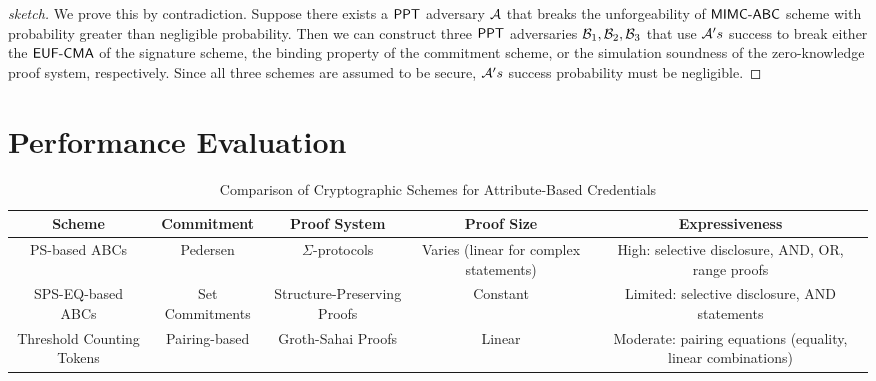 \begin{proof}[sketch]
    We prove this by contradiction. Suppose there exists a $\mathsf{PPT}$ adversary $\mathcal{A}$ that breaks the unforgeability of $\mathsf{MIMC\text{-}ABC}$ scheme with probability greater than negligible probability. Then we can construct three $\mathsf{PPT}$ adversaries $\mathcal{B}_1, \mathcal{B}_2, \mathcal{B}_3$ that use $\mathcal{A}'s$ success to break either the $\mathsf{EUF\text{-}CMA}$ of the signature scheme, the binding property of the commitment scheme, or the simulation soundness of the zero-knowledge proof system, respectively. Since all three schemes are assumed to be secure, $\mathcal{A}'s$ success probability must be negligible.
\end{proof}












\newpage
\section{Performance Evaluation}

\begin{table}[h]
    \centering
    \begin{tabular}{|c|c|c|c|c|}
        \hline
        \textbf{Scheme} & \textbf{Commitment} & \textbf{Proof System} & \textbf{Proof Size} & \textbf{Expressiveness} \\
        \hline
        PS-based ABCs & Pedersen & $\Sigma$-protocols & Varies (linear for complex statements) & High: selective disclosure, AND, OR, range proofs \\
        \hline
        SPS-EQ-based ABCs & Set Commitments & Structure-Preserving Proofs & Constant & Limited: selective disclosure, AND statements \\
        \hline
        Threshold Counting Tokens & Pairing-based & Groth-Sahai Proofs & Linear & Moderate: pairing equations (equality, linear combinations) \\
        \hline
    \end{tabular}
    \caption{Comparison of Cryptographic Schemes for Attribute-Based Credentials}
    \label{tab:abc_comparison}
\end{table}






